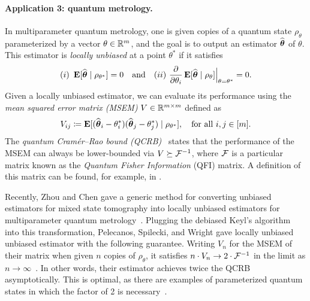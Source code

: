 \documentclass{article}
\begin{document}
\paragraph{Application 3: quantum metrology.}

In multiparameter quantum metrology, one is given copies of a quantum state $\rho_{\theta}$ parameterized by a vector $\theta \in \mathbb R^m$, and the goal is to output an estimator $\widehat{\boldsymbol{\theta}}$ of $\theta$.
This estimator is \emph{locally unbiased} at a point $\theta^*$ if it satisfies
\begin{equation*}
    (i)~\mathop{\bf E\/}[\widehat{\boldsymbol{\theta}} \mid \rho_{\theta^*}] = 0
    \quad\text{and}\quad
    (ii)~\frac{\partial}{\partial \theta_i} \mathop{\bf E\/}[\widehat{\boldsymbol{\theta}} \mid \rho_{\theta}]\Big|_{\theta = \theta^*} = 0.
\end{equation*}
Given a locally unbiased estimator, we can evaluate its performance using the \emph{mean squared error matrix (MSEM)} $V \in \mathbb R^{m \times m}$ defined as
\begin{equation*}
    V_{ij} \coloneqq \mathop{\bf E\/}[(\widehat{\boldsymbol{\theta}}_i - \theta_i^*)(\widehat{\boldsymbol{\theta}}_j - \theta_j^*) \mid \rho_{\theta^*}], \quad \text{for all $i, j \in [m]$}.
\end{equation*}
The \emph{quantum Cramér–Rao bound (QCRB)}~\cite{Hel67b} states that the performance of the MSEM can always be lower-bounded via $V \succeq \mathcal{F}^{-1}$, where $\mathcal{F}$ is a particular matrix known as the \emph{Quantum Fisher Information} (QFI) matrix.
A definition of this matrix can be found, for example, in \cite[Section 1.6]{PSW25}.

Recently, Zhou and Chen gave a generic method for converting unbiased estimators for mixed state tomography into locally unbiased estimators for multiparameter quantum metrology~\cite{ZC25}.
Plugging the debiased Keyl's algorithm into this transformation,
Pelecanos, Spilecki, and Wright gave locally unbiased unbiased estimator with the following guarantee.
Writing $V_n$ for the MSEM of their matrix when given $n$ copies of $\rho_{\theta}$, it satisfies $n \cdot V_n \rightarrow 2\cdot \mathcal{F}^{-1}$ in the limit as $n \rightarrow \infty$~\cite[Theorem 1.10]{PSW25}.
In other words, their estimator achieves twice the QCRB asymptotically.
This is optimal, as there are examples of parameterized quantum states in which the factor of 2 is necessary~\cite[Section 3.1.1]{DGG20}.
\end{document}
